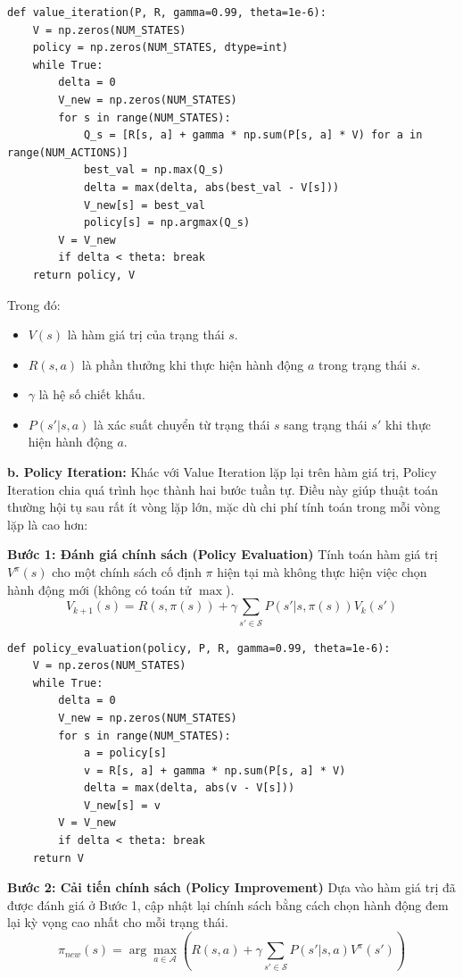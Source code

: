 \begin{lstlisting}[style=PythonStyle, caption={Value Iteration Implementation}]
def value_iteration(P, R, gamma=0.99, theta=1e-6):
    V = np.zeros(NUM_STATES)
    policy = np.zeros(NUM_STATES, dtype=int)
    while True:
        delta = 0
        V_new = np.zeros(NUM_STATES)
        for s in range(NUM_STATES):
            Q_s = [R[s, a] + gamma * np.sum(P[s, a] * V) for a in range(NUM_ACTIONS)]
            best_val = np.max(Q_s)
            delta = max(delta, abs(best_val - V[s]))
            V_new[s] = best_val
            policy[s] = np.argmax(Q_s)
        V = V_new
        if delta < theta: break
    return policy, V
\end{lstlisting}Trong đó:
\begin{itemize}
    \item $V(s)$ là hàm giá trị của trạng thái $s$.
    \item $R(s, a)$ là phần thưởng khi thực hiện hành động $a$ trong trạng thái $s$.
    \item $\gamma$ là hệ số chiết khấu.
    \item $P(s'|s,a)$ là xác suất chuyển từ trạng thái $s$ sang trạng thái $s'$ khi thực hiện hành động $a$.
\end{itemize}

\textbf{b. Policy Iteration:}
Khác với Value Iteration lặp lại trên hàm giá trị, Policy Iteration chia quá trình học thành hai bước tuần tự. Điều này giúp thuật toán thường hội tụ sau rất ít vòng lặp lớn, mặc dù chi phí tính toán trong mỗi vòng lặp là cao hơn:

\textbf{Bước 1: Đánh giá chính sách (Policy Evaluation)}
Tính toán hàm giá trị $V^\pi(s)$ cho một chính sách cố định $\pi$ hiện tại mà không thực hiện việc chọn hành động mới (không có toán tử $\max$).
\begin{equation} 
    V_{k+1}(s) = R(s, \pi(s)) + \gamma \sum_{s' \in \mathcal{S}} P(s'|s,\pi(s)) V_k(s')
\end{equation}

\begin{lstlisting}[style=PythonStyle, caption={Policy Evaluation}]
def policy_evaluation(policy, P, R, gamma=0.99, theta=1e-6):
    V = np.zeros(NUM_STATES)
    while True:
        delta = 0
        V_new = np.zeros(NUM_STATES)
        for s in range(NUM_STATES):
            a = policy[s]
            v = R[s, a] + gamma * np.sum(P[s, a] * V)
            delta = max(delta, abs(v - V[s]))
            V_new[s] = v
        V = V_new
        if delta < theta: break
    return V
\end{lstlisting}
\textbf{Bước 2: Cải tiến chính sách (Policy Improvement)}
Dựa vào hàm giá trị đã được đánh giá ở Bước 1, cập nhật lại chính sách bằng cách chọn hành động đem lại kỳ vọng cao nhất cho mỗi trạng thái.
\begin{equation} 
    \pi_{new}(s) = \arg\max_{a \in \mathcal{A}} \left( R(s, a) + \gamma \sum_{s' \in \mathcal{S}} P(s'|s,a) V^\pi(s') \right)
\end{equation}

